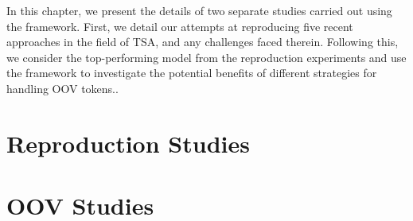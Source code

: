 \documentclass[../../fyp.tex]{subfiles}
\begin{document}
In this chapter, we present the details of two separate studies carried out using the framework. First, we detail our attempts at reproducing five recent approaches in the field of TSA, and any challenges faced therein. Following this, we consider the top-performing model from the reproduction experiments and use the framework to investigate the potential benefits of different strategies for handling OOV tokens..

\section{Reproduction Studies}


\section{OOV Studies}
\end{document}
